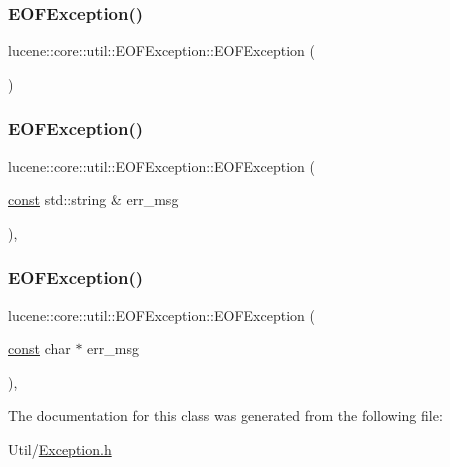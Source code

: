 \subsubsection{\texorpdfstring{E\+O\+F\+Exception()}{EOFException()}\hspace{0.1cm}{\footnotesize\ttfamily [1/3]}}
{\footnotesize\ttfamily lucene\+::core\+::util\+::\+E\+O\+F\+Exception\+::\+E\+O\+F\+Exception (\begin{DoxyParamCaption}{ }\end{DoxyParamCaption})\hspace{0.3cm}{\ttfamily [inline]}}

\mbox{\label{classlucene_1_1core_1_1util_1_1EOFException_a4c834615e855d3abc6452d5ad24f4e5d}} 
\subsubsection{\texorpdfstring{E\+O\+F\+Exception()}{EOFException()}\hspace{0.1cm}{\footnotesize\ttfamily [2/3]}}
{\footnotesize\ttfamily lucene\+::core\+::util\+::\+E\+O\+F\+Exception\+::\+E\+O\+F\+Exception (\begin{DoxyParamCaption}\item[{\mbox{\hyperlink{ZlibCrc32_8h_a2c212835823e3c54a8ab6d95c652660e}{const}} std\+::string \&}]{err\+\_\+msg }\end{DoxyParamCaption})\hspace{0.3cm}{\ttfamily [inline]}, {\ttfamily [explicit]}}

\mbox{\label{classlucene_1_1core_1_1util_1_1EOFException_aea1b30e759de38b8497ca0059a8c042a}} 
\subsubsection{\texorpdfstring{E\+O\+F\+Exception()}{EOFException()}\hspace{0.1cm}{\footnotesize\ttfamily [3/3]}}
{\footnotesize\ttfamily lucene\+::core\+::util\+::\+E\+O\+F\+Exception\+::\+E\+O\+F\+Exception (\begin{DoxyParamCaption}\item[{\mbox{\hyperlink{ZlibCrc32_8h_a2c212835823e3c54a8ab6d95c652660e}{const}} char $\ast$}]{err\+\_\+msg }\end{DoxyParamCaption})\hspace{0.3cm}{\ttfamily [inline]}, {\ttfamily [explicit]}}



The documentation for this class was generated from the following file\+:\begin{DoxyCompactItemize}
\item 
Util/\mbox{\hyperlink{Util_2Exception_8h}{Exception.\+h}}\end{DoxyCompactItemize}

